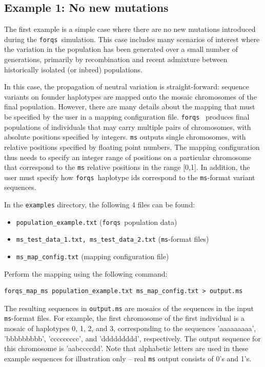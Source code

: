 \documentclass{article}
\newcommand{\forqs}[0]{\texttt{forqs }}
\begin{document}
\subsection{Example 1:  No new mutations}

The first example is a simple case where there are no new mutations introduced
during the \forqs simulation.  This case includes many scenarios of interest
where the variation in the population has been generated over a small number of
generations, primarily by recombination and recent admixture between
historically isolated (or inbred) populations.

In this case, the propagation of neutral variation is straight-forward:
sequence variants on founder haplotypes are mapped onto the mosaic chromosomes
of the final population.  However, there are many details about the mapping
that must be specified by the user in a mapping configuration file.  \forqs
produces final populations of individuals that may carry multiple pairs of
chromosomes, with absolute positions specified by integers.  \texttt{ms}
outputs single chromosomes, with relative positions specified by floating point
numbers.  The mapping configuration thus needs to specify an integer range of
positions on a particular chromosome that correspond to the \texttt{ms}
relative positions in the range [0,1].  In addition, the user must specify how
\forqs haplotype ids correspond to the \texttt{ms}-format variant sequences.

In the \texttt{examples} directory, the following 4 files can be found:
\begin{itemize}
    \item \texttt{population\_example.txt} (\forqs population data)
    \item \texttt{ms\_test\_data\_1.txt, ms\_test\_data\_2.txt} (\texttt{ms}-format files)
    \item \texttt{ms\_map\_config.txt} (mapping configuration file)
\end{itemize}

Perform the mapping using the following command:
\begin{small}
\begin{verbatim}
forqs_map_ms population_example.txt ms_map_config.txt > output.ms
\end{verbatim}
\end{small}

The resulting sequences in \texttt{output.ms} are mosaics of the sequences in
the input \texttt{ms}-format files.  For example, the first chromosome of the
first individual is a mosaic of haplotypes 0, 1, 2, and 3, corresponding to the
sequences 'aaaaaaaaa', 'bbbbbbbbb', 'ccccccccc', and 'ddddddddd', respectively.
The output sequence for this chromosome is 'aabccccdd'.  Note that alphabetic
letters are used in these example sequences for illustration only -- real
\texttt{ms} output consists of 0's and 1's.
\end{document}
